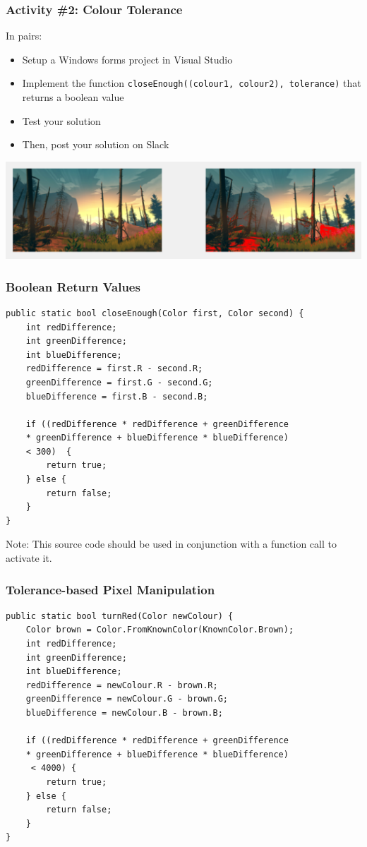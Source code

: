 \begin{frame}
	\frametitle{Activity \#2: Colour Tolerance}
	
	In pairs:
	
	\vspace{.5em}
	
	\begin{itemize}		
		\item Setup a Windows forms project in Visual Studio
		\item Implement the function \texttt{closeEnough((colour1, colour2), tolerance)} that returns a boolean value
		\item Test your solution
		\item Then, post your solution on Slack
	\end{itemize}
	\vspace{.5em}
\includegraphics[scale=0.5]{GoingRed}
\end{frame}

\begin{frame}[fragile]
	\frametitle{Boolean Return Values}
	
\begin{lstlisting}
public static bool closeEnough(Color first, Color second) {
	int redDifference;
	int greenDifference;
	int blueDifference;
	redDifference = first.R - second.R;
	greenDifference = first.G - second.G;
	blueDifference = first.B - second.B;
	
	if ((redDifference * redDifference + greenDifference
	* greenDifference + blueDifference * blueDifference)
	< 300)	{
		return true;
	} else {
		return false;
	}
}
\end{lstlisting}

Note: This source code should be used in conjunction with a function call to activate it.

\end{frame}

\begin{frame}[fragile]
	\frametitle{Tolerance-based Pixel Manipulation}
	
\begin{lstlisting}
public static bool turnRed(Color newColour) {
	Color brown = Color.FromKnownColor(KnownColor.Brown);
	int redDifference;
	int greenDifference;
	int blueDifference;
	redDifference = newColour.R - brown.R;
	greenDifference = newColour.G - brown.G;
	blueDifference = newColour.B - brown.B;
	
	if ((redDifference * redDifference + greenDifference
	* greenDifference + blueDifference * blueDifference)
	 < 4000) {
		return true;
	} else {
		return false;
	}	
}

\end{lstlisting}


\end{frame}

